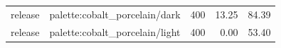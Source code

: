 \begin{longtable}{l>{\raggedright\arraybackslash}p{.42\linewidth}rrr}
release & %
palette:cobalt\_\allowbreak{}porcelain/dark & %
400 & %
13.25 & %
84.39 \\ %

release & %
palette:cobalt\_\allowbreak{}porcelain/light & %
400 & %
0.00 & %
53.40 \\ %


\end{longtable}
